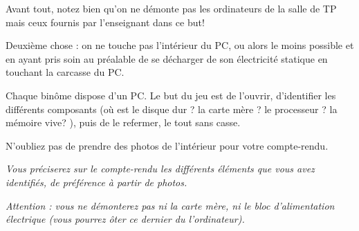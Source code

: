 \begin{multicols}{2}
Avant tout, notez bien qu'on ne démonte pas les ordinateurs de la
salle de TP mais ceux fournis par l'enseignant dans ce but!

Deuxième chose : on ne touche pas l'intérieur du PC, ou alors le moins
possible et  en ayant pris  soin au préalable  de se décharger  de son
électricité statique en touchant la carcasse du PC.

Chaque  binôme  dispose  d'un PC.  Le  but  du  jeu est  de  l'ouvrir,
d'identifier  les différents  composants (où  est le  disque dur ? la
carte mère ? le processeur ?  la mémoire vive? ), puis de le refermer,
le tout sans casse.

N'oubliez pas de prendre des photos de l'intérieur pour votre
compte-rendu.

\emph{Vous préciserez sur le compte-rendu les différents éléments
  que vous avez identifiés, de préférence à partir de photos.}

\emph{Attention : vous ne démonterez pas ni la carte mère, ni le bloc d'alimentation électrique (vous pourrez ôter ce dernier du l'ordinateur).}  
\end{multicols}